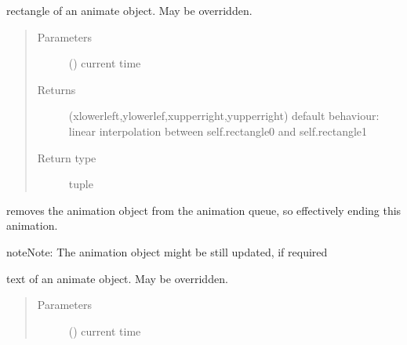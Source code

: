 \documentclass[letterpaper,10pt,english]{sphinxmanual}
\begin{document}
\begin{fulllineitems}

\begin{fulllineitems}
\label{\detokenize{Reference:salabim.Animate.rectangle}}
rectangle of an animate object. May be overridden.
\begin{quote}\begin{description}
\item[{Parameters}] \leavevmode
{} () \textendash{} current time

\item[{Returns}] \leavevmode
{} \textendash{} (xlowerleft,ylowerlef,xupperright,yupperright) 
default behaviour: linear interpolation between self.rectangle0 and self.rectangle1

\item[{Return type}] \leavevmode
tuple

\end{description}\end{quote}

\end{fulllineitems}


\begin{fulllineitems}
\label{\detokenize{Reference:salabim.Animate.remove}}
removes the animation object from the animation queue,
so effectively ending this animation.

\begin{sphinxadmonition}{note}{Note:}
The animation object might be still updated, if required
\end{sphinxadmonition}

\end{fulllineitems}


\begin{fulllineitems}
\label{\detokenize{Reference:salabim.Animate.text}}
text of an animate object. May be overridden.
\begin{quote}\begin{description}
\item[{Parameters}] \leavevmode
{} () \textendash{} current time


\end{description}
\end{quote}
\end{fulllineitems}
\end{fulllineitems}
\end{document}
